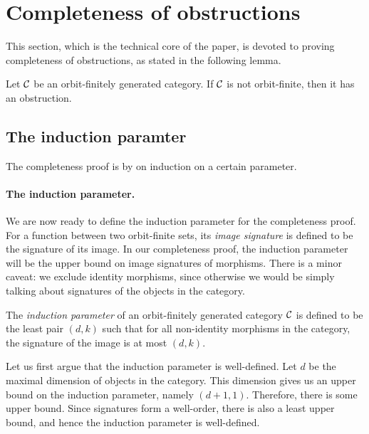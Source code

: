 
\section{Completeness of obstructions}
\label{sec:completeness-of-obstructions}


This section, which is the technical core of the paper, is devoted to proving  completeness of obstructions, as stated in the following lemma.
\begin{lemma}\label{lem:completeness-of-obstructions}
    Let ${\mathcal C}$ be an orbit-finitely generated category. If ${\mathcal C}$ is not orbit-finite, then it has an obstruction.
\end{lemma}



\subsection{The induction paramter}
\label{sec:induction-parameter}
The completeness proof is by on induction on a certain parameter. 

\paragraph*{The induction parameter.} We are now ready to define the induction parameter for the completeness proof.
For a function between two orbit-finite sets, its \emph{image signature} is defined to be the signature of its image. In our completeness proof, the induction parameter will be the upper bound on image signatures of morphisms. There is a minor caveat: we exclude identity morphisms, since otherwise we would be simply talking about signatures of the objects in the category.

\begin{definition}
    The \emph{induction parameter} of an orbit-finitely generated category ${\mathcal C}$ is defined to be the least pair $(d,k)$ such that for all non-identity morphisms in the category, the signature of the image is at most $(d,k)$.
\end{definition}

Let us first argue that the induction parameter is well-defined. Let $d$ be the maximal dimension of objects in the category. This dimension gives us an upper bound on the induction parameter, namely $(d+1,1)$. Therefore, there is some upper bound. 
Since signatures form a well-order, there is also a  least upper bound, and hence the induction parameter is well-defined.  

